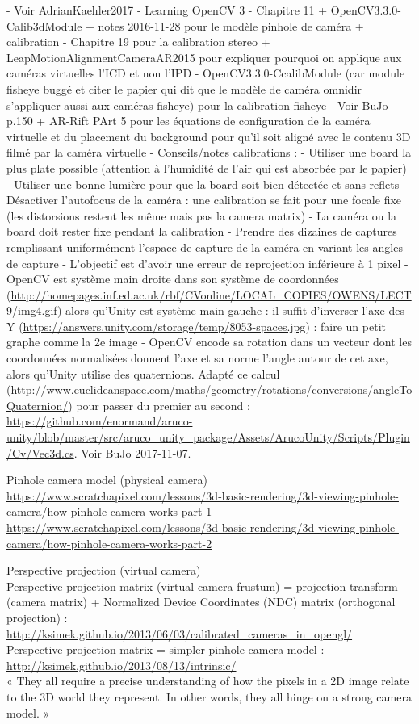 - Voir AdrianKaehler2017 - Learning OpenCV 3
  - Chapitre 11 + OpenCV3.3.0-Calib3dModule + notes 2016-11-28 pour le modèle pinhole de caméra + calibration
  - Chapitre 19 pour la calibration stereo + LeapMotionAlignmentCameraAR2015 pour expliquer pourquoi on applique aux caméras virtuelles l'ICD et non l'IPD
  - OpenCV3.3.0-CcalibModule (car module fisheye buggé et citer le papier qui dit que le modèle de caméra omnidir s'appliquer aussi aux caméras fisheye) pour la calibration fisheye
- Voir BuJo p.150 + AR-Rift PArt 5 pour les équations de configuration de la caméra virtuelle et du placement du background pour qu'il soit aligné avec le contenu 3D filmé par la caméra virtuelle
- Conseils/notes calibrations :
  - Utiliser une board la plus plate possible (attention à l'humidité de l'air qui est absorbée par le papier)
  - Utiliser une bonne lumière pour que la board soit bien détectée et sans reflets
  - Désactiver l'autofocus de la caméra : une calibration se fait pour une focale fixe (les distorsions restent les même mais pas la camera matrix)
  - La caméra ou la board doit rester fixe pendant la calibration
  - Prendre des dizaines de captures remplissant uniformément l'espace de capture de la caméra en variant les angles de capture
  - L'objectif est d'avoir une erreur de reprojection inférieure à 1 pixel
  - OpenCV est système main droite dans son système de coordonnées (\url{http://homepages.inf.ed.ac.uk/rbf/CVonline/LOCAL_COPIES/OWENS/LECT9/img4.gif}) alors qu'Unity est système main gauche : il suffit d'inverser l'axe des Y (\url{https://answers.unity.com/storage/temp/8053-spaces.jpg}) : faire un petit graphe comme la 2e image
  - OpenCV encode sa rotation dans un vecteur dont les coordonnées normalisées donnent l'axe et sa norme l'angle autour de cet axe, alors qu'Unity utilise des quaternions. Adapté ce calcul (\url{http://www.euclideanspace.com/maths/geometry/rotations/conversions/angleToQuaternion/}) pour passer du premier au second : \url{https://github.com/enormand/aruco-unity/blob/master/src/aruco_unity_package/Assets/ArucoUnity/Scripts/Plugin/Cv/Vec3d.cs}. Voir BuJo 2017-11-07.

Pinhole camera model (physical camera)\\
\url{https://www.scratchapixel.com/lessons/3d-basic-rendering/3d-viewing-pinhole-camera/how-pinhole-camera-works-part-1}\\
\url{https://www.scratchapixel.com/lessons/3d-basic-rendering/3d-viewing-pinhole-camera/how-pinhole-camera-works-part-2}

Perspective projection (virtual camera)\\
Perspective projection matrix (virtual camera frustum) = projection transform (camera matrix) + Normalized Device Coordinates (NDC) matrix (orthogonal projection) : \url{http://ksimek.github.io/2013/06/03/calibrated_cameras_in_opengl/}\\
Perspective projection matrix = simpler pinhole camera model : \url{http://ksimek.github.io/2013/08/13/intrinsic/}\\
« They all require a precise understanding of how the pixels in a 2D image relate to the 3D world they represent. In other words, they all hinge on a strong camera model. »\\

